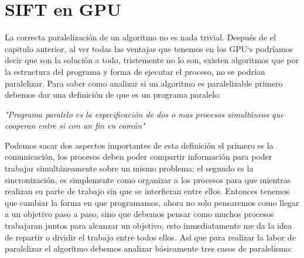 
\chapter{ SIFT en GPU}

La correcta paralelización de un algoritmo no es nada trivial. Después de el capitulo anterior, al ver todas las ventajas que tenemos en los GPU`s podríamos decir que son la solución a todo, tristemente no lo son, existen algoritmos que por la estructura del programa y forma de ejecutar el proceso, no se podrían paralelizar. Para saber como analizar si un algoritmo es paralelizable primero debemos dar una definición de que es un programa paralelo:

\begin{center}
\textit{"Programa paralelo es la especificación de dos o mas procesos simultáneos que cooperan entre si con un fin en común"}
\end{center}

Podemos sacar dos aspectos importantes de esta definición el primero es la comunicación, los procesos deben poder compartir información  para poder trabajar simultáneamente sobre un mismo problema; el segundo es la sincronización, es simplemente como organizar a los procesos para que mientras realizan su parte de trabajo sin que se interfieran entre ellos.
Entonces tenemos que cambiar la forma en que programamos, ahora no solo pensaremos como llegar a un objetivo paso a paso, sino  que debemos pensar como muchos procesos trabajaran juntos para alcanzar un objetivo, esto inmediatamente me da la idea de repartir o dividir el trabajo entre todos ellos. Así que para realizar la labor de paralelizar el algoritmo debemos analizar básicamente tres casos de paralelismo:
 

